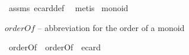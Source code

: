 \begin{isabellebody}
%
\isatagproof
{}\isamarkupfalse%
\ assms\ ecard{\isacharunderscore}{\kern0pt}def\ \isamarkupfalse%
\ metis%
\endisatagproof
{\isafoldproof}%
%
\isadelimproof
\isanewline
%
\endisadelimproof
\isanewline
\isanewline
{}\isamarkupfalse%
\ monoid\isanewline
{}%
\begin{isamarkuptext}%
$orderOf$ -- abbreviation for the order of a monoid%
\end{isamarkuptext}\isamarkuptrue%
\isamarkupfalse%
\ orderOf\ \ {\isachardoublequoteopen}orderOf\ {\isacharequal}{\kern0pt}{\isacharequal}{\kern0pt}\ ecard{\isachardoublequoteclose}\isanewline
\isanewline
\isanewline
{}\isamarkupfalse%
\isanewline
%
\isadelimtheory
\isanewline
%
\endisadelimtheory
%
\isatagtheory
{}\isamarkupfalse%
%
\endisatagtheory
{\isafoldtheory}%
%
\isadelimtheory
%
\endisadelimtheory
%
\end{isabellebody}%
\endinput
